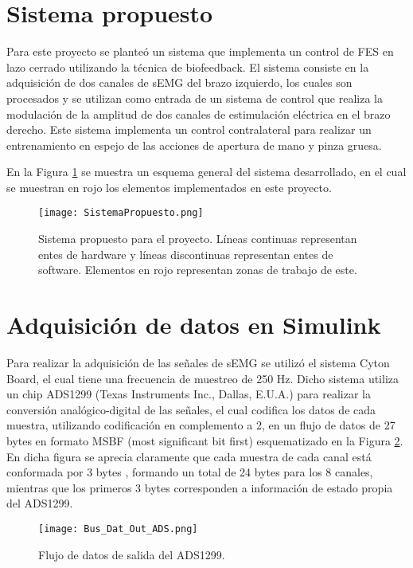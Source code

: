\section{Sistema propuesto}
Para este proyecto se planteó un sistema que implementa un control de FES en lazo cerrado utilizando la técnica de biofeedback. El sistema consiste en la adquisición de dos canales de sEMG del brazo izquierdo, los cuales son procesados y se utilizan como entrada de un sistema de control que realiza la modulación de la amplitud de dos canales de estimulación eléctrica en el brazo derecho. Este sistema implementa un control contralateral para realizar un entrenamiento en espejo de las acciones de apertura de mano y pinza gruesa.

En la Figura \ref{Figura: SistProp} se muestra un esquema general del sistema desarrollado, en el cual se muestran en rojo los elementos implementados en este proyecto.

\begin{figure}[htbp]
\centering
	\texttt{[image: SistemaPropuesto.png]}
	\caption[Sistema propuesto para el proyecto]{Sistema propuesto para el proyecto. Líneas continuas representan entes de hardware y líneas discontinuas representan entes de software. Elementos en rojo representan zonas de trabajo de este.}
	\label{Figura: SistProp}
\end{figure}


\section{Adquisición de datos en Simulink\textregistered} \label{Sec: Adquisicion}
Para realizar la adquisición de las señales de sEMG se utilizó el sistema Cyton Board, el cual tiene una frecuencia de muestreo de 250 Hz. Dicho sistema utiliza un chip ADS1299 (Texas Instruments Inc., Dallas, E.U.A.) para realizar la conversión analógico-digital de las señales, el cual codifica los datos de cada muestra, utilizando codificación en complemento a 2, en un flujo de datos de 27 bytes en formato MSBF (most significant bit first) esquematizado en la Figura \ref{Figura: BusOut}. En dicha figura se aprecia claramente que cada muestra de cada canal está conformada por 3 bytes , formando un total de 24 bytes para los 8 canales, mientras que los primeros 3 bytes corresponden a información de estado propia del ADS1299.

\begin{figure}[htbp]
\centering
	\texttt{[image: Bus\_Dat\_Out\_ADS.png]}
	\caption{Flujo de datos de salida del ADS1299.}
	\label{Figura: BusOut}
\end{figure}

